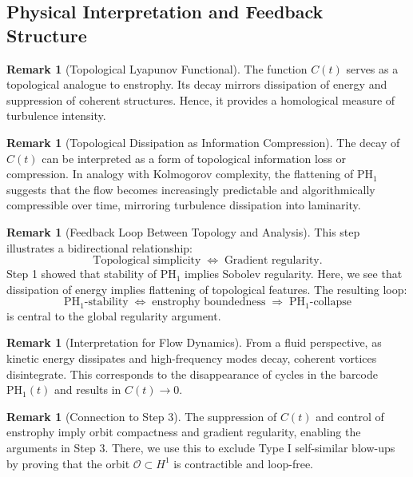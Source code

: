 \documentclass[11pt]{article}
\theoremstyle{definition}
\newtheorem{remark}[theorem]{Remark}
\begin{document}
\subsection{Physical Interpretation and Feedback Structure}

\begin{remark}[Topological Lyapunov Functional]
The function $C(t)$ serves as a topological analogue to enstrophy. Its decay mirrors dissipation of energy and suppression of coherent structures. Hence, it provides a homological measure of turbulence intensity.
\end{remark}

\begin{remark}[Topological Dissipation as Information Compression]
The decay of $C(t)$ can be interpreted as a form of topological information loss or compression. In analogy with Kolmogorov complexity, the flattening of $\mathrm{PH}_1$ suggests that the flow becomes increasingly predictable and algorithmically compressible over time, mirroring turbulence dissipation into laminarity.
\end{remark}

\begin{remark}[Feedback Loop Between Topology and Analysis]
This step illustrates a bidirectional relationship:
\[
\text{Topological simplicity} \;\Longleftrightarrow\; \text{Gradient regularity}.
\]
Step 1 showed that stability of $\mathrm{PH}_1$ implies Sobolev regularity. Here, we see that dissipation of energy implies flattening of topological features. The resulting loop:
\[
\mathrm{PH}_1\text{-stability} \;\Leftrightarrow\; \text{enstrophy boundedness} \;\Rightarrow\; \mathrm{PH}_1\text{-collapse}
\]
is central to the global regularity argument.
\end{remark}

\begin{remark}[Interpretation for Flow Dynamics]
From a fluid perspective, as kinetic energy dissipates and high-frequency modes decay, coherent vortices disintegrate. This corresponds to the disappearance of cycles in the barcode $\mathrm{PH}_1(t)$ and results in $C(t) \to 0$.
\end{remark}

\begin{remark}[Connection to Step 3]
The suppression of $C(t)$ and control of enstrophy imply orbit compactness and gradient regularity, enabling the arguments in Step 3. There, we use this to exclude Type I self-similar blow-ups by proving that the orbit $\mathcal{O} \subset H^1$ is contractible and loop-free.
\end{remark}
\end{document}

